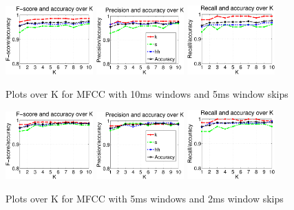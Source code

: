 		\begin{figure}
			\centering\includegraphics[width=0.3\textwidth]{tex/appendices/test/mfcc105FP.png}
			\centering\includegraphics[width=0.3\textwidth]{tex/appendices/test/mfcc105_P.png}
			\centering\includegraphics[width=0.3\textwidth]{tex/appendices/test/mfcc105_R.png}
			
			\caption{Plots over K for MFCC with 10ms windows and 5ms window skips}
		\end{figure}
		\begin{figure}
			\centering\includegraphics[width=0.3\textwidth]{tex/appendices/test/mfcc52FP.png}
			\centering\includegraphics[width=0.3\textwidth]{tex/appendices/test/mfcc52_P.png}
			\centering\includegraphics[width=0.3\textwidth]{tex/appendices/test/mfcc52_R.png}
			
			\caption{Plots over K for MFCC with 5ms windows and 2ms window skips}
		\end{figure}\clearpage
		
